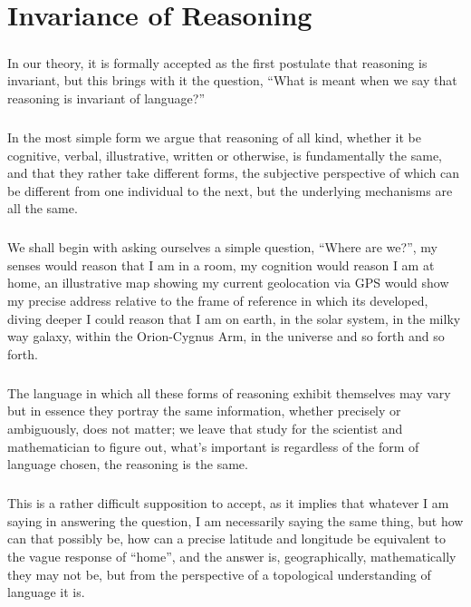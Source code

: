 \chapter{Invariance of Reasoning}\label{chapter:invarianceofreasoning}

\paragraph{}In our theory, it is formally accepted as the first postulate that reasoning is invariant, but this brings with it the question, ``What is meant when we say that reasoning is invariant of language?''

\paragraph{}In the most simple form we argue that reasoning of all kind, whether it be cognitive, verbal, illustrative, written or otherwise, is fundamentally the same, and that they rather take different forms, the subjective perspective of which can be different from one individual to the next, but the underlying mechanisms are all the same.

\paragraph{}We shall begin with asking ourselves a simple question, ``Where are we?'', my senses would reason that I am in a room, my cognition would reason I am at home, an illustrative map showing my current geolocation via GPS would show my precise address relative to the frame of reference in which its developed, diving deeper I could reason that I am on earth, in the solar system, in the milky way galaxy, within the Orion-Cygnus Arm, in the universe and so forth and so forth.

\paragraph{}The language in which all these forms of reasoning exhibit themselves may vary but in essence they portray the same information, whether precisely or ambiguously, does not matter; we leave that study for the scientist and mathematician to figure out, what’s important is regardless of the form of language chosen, the reasoning is the same.

\paragraph{}This is a rather difficult supposition to accept, as it implies that whatever I am saying in answering the question, I am necessarily saying the same thing, but how can that possibly be, how can a precise latitude and longitude be equivalent to the vague response of ``home'', and the answer is, geographically, mathematically they may not be, but from the perspective of a topological understanding of language it is.

